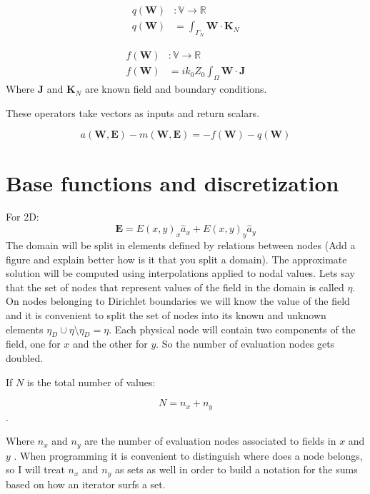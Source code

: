 \begin{equation}
\begin{array}{rcl}
      q(\mathbf{W})&:\mathbb{V}\rightarrow \mathbb{R}\\
      q(\mathbf{W})&=\int_{\Gamma_N} \mathbf{W} \cdot\mathbf{K}_N
\label{eq:m_def}
\end{array}
\end{equation}

\begin{equation}
\begin{array}{rcl}
      f(\mathbf{W})&:\mathbb{V}\rightarrow \mathbb{R}\\
      f(\mathbf{W})&=ik_0Z_0 \int_{\Omega} \mathbf{W}\cdot\mathbf{J}
\label{eq:m_def}
\end{array}
\end{equation}
Where $\mathbf{J}$ and $\mathbf{K}_N$ are known field and boundary conditions.

These operators take vectors as inputs and return scalars. 

\begin{equation}
a(\mathbf{W},\mathbf{E}) - m(\mathbf{W},\mathbf{E}) = -f(\mathbf{W})-q(\mathbf{W})
\label{eq:abstract_E_wave}
\end{equation}

\section{Base functions and discretization}
For 2D:
$$\mathbf{E}=E(x,y)_x\hat{a}_x + E(x,y)_y \hat{a}_y $$
The domain will be split in elements defined by relations between nodes (Add a figure and explain better how is it that you split a domain). The approximate solution will be computed using interpolations applied to nodal values. 
Lets say that the set of nodes that represent values of the field in the domain is called $\eta$. On nodes belonging to Dirichlet boundaries we will know the value of the field and it is convenient to split the set of nodes into its known and unknown elements $\eta_D\cup\eta\setminus\eta_D=\eta$.  Each physical node will contain two components of the field, one for $x$ and the other for $y$. So the number of evaluation nodes gets doubled.

If $N$ is the total number of values:

$$N = n_x+ n_y$$.

Where $n_x$ and $n_y$ are the number of evaluation nodes associated to fields in $x$ and  $y$	. When programming it is convenient to distinguish where does a node belongs, so I will treat $n_x$ and $n_y$ as sets as well in order to build a notation for the sums based on  how an iterator surfs a set.

